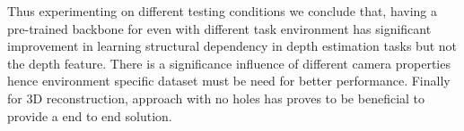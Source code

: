 Thus experimenting on different testing conditions we conclude that, having a pre-trained backbone for even with different task environment has significant improvement in learning structural dependency in depth estimation tasks but not the depth feature. There is a significance influence of different camera properties hence environment specific dataset must be need for better performance. Finally for 3D reconstruction, approach with no holes has proves to be beneficial to provide a end to end solution.